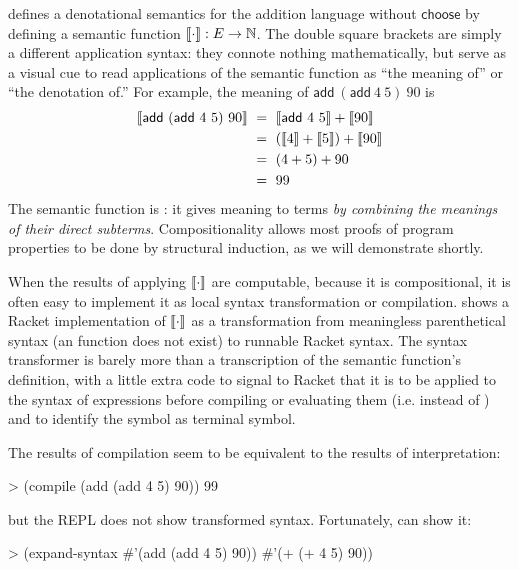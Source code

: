  defines a denotational semantics for the addition language without $\mathsf{choose}$ by defining a semantic function $\left\llbracket{\cdot}\right\rrbracket : E \to \mathbb{N}$.
The double square brackets are simply a different application syntax: they connote nothing mathematically, but serve as a visual cue to read applications of the semantic function as ``the meaning of'' or ``the denotation of.''
For example, the meaning of $\mathsf{add}~(\mathsf{add}~4~5)~90$ is
\begin{equation}
\begin{aligned}
	\left\llbracket{\mathsf{add}~(\mathsf{add}~4~5)~90}\right\rrbracket
	&\ =\ \left\llbracket{\mathsf{add}~4~5}\right\rrbracket + \left\llbracket{90}\right\rrbracket
\\
	&\ =\ (\left\llbracket{4}\right\rrbracket + \left\llbracket{5}\right\rrbracket) + \left\llbracket{90}\right\rrbracket
\\
	&\ =\ (4 + 5) + 90
\\
	&\ =\ 99
\end{aligned}
\end{equation}
The semantic function is : it gives meaning to terms \emph{by combining the meanings of their direct subterms}.
Compositionality allows most proofs of program properties to be done by structural induction, as we will demonstrate shortly.

When the results of applying $\left\llbracket{\cdot}\right\rrbracket$ are computable, because it is compositional, it is often easy to implement it as local syntax transformation or compilation.
 shows a Racket implementation of $\left\llbracket{\cdot}\right\rrbracket$ as a transformation from meaningless parenthetical syntax (an  function does not exist) to runnable Racket syntax.
The syntax transformer is barely more than a transcription of the semantic function's definition, with a little extra code to signal to Racket that it is to be applied to the syntax of expressions before compiling or evaluating them (i.e.  instead of ) and to identify the symbol  as terminal symbol.

The results of compilation seem to be equivalent to the results of interpretation:
\begin{center}
\singlespacing
\begin{schemedisplay}
> (compile (add (add 4 5) 90))
99
\end{schemedisplay}
\end{center}
but the REPL does not show transformed syntax.
Fortunately,  can show it:
\begin{center}
\singlespacing
\begin{schemedisplay}
> (expand-syntax #'(add (add 4 5) 90))
#'(+ (+ 4 5) 90))
\end{schemedisplay}
\end{center}

